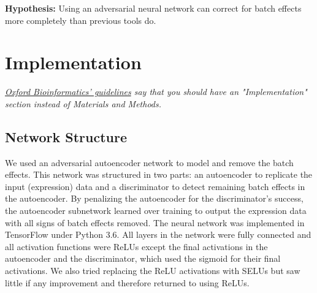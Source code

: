 \documentclass[notitlepage]{article}
\begin{document}
\textbf{Hypothesis:}
Using an adversarial neural network can correct for batch effects more completely than previous tools do. %

\section{Implementation}

\emph{\href{https://bmcbioinformatics.biomedcentral.com/submission-guidelines/preparing-your-manuscript/software-article}{Oxford Bioinformatics' guidelines} say that you should have an "Implementation" section instead of Materials and Methods.}

\subsection{Network Structure}

We used an adversarial autoencoder network to model and remove the batch effects.
This network was structured in two parts: an autoencoder to replicate the input (expression) data and a discriminator to detect remaining batch effects in the autoencoder.
By penalizing the autoencoder for the discriminator's success, the autoencoder subnetwork learned over training to output the expression data with all signs of batch effects removed.
The neural network was implemented in TensorFlow under Python 3.6.
All layers in the network were fully connected and all activation functions were ReLUs \cite{agarap_deep_2018} except the final activations in the autoencoder and the discriminator, which used the sigmoid for their final activations.
We also tried replacing the ReLU activations with SELUs \cite{klambauer_self-normalizing_2017} but saw little if any improvement and therefore returned to using ReLUs.
\end{document}
